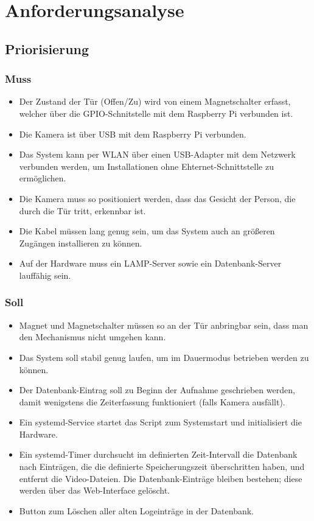 \chapter{Anforderungsanalyse}

\section{Priorisierung}

\subsection{Muss}
\begin{itemize}
    \item Der Zustand der T\"ur (Offen/Zu) wird von einem Magnetschalter erfasst, welcher \"uber die GPIO-Schnitstelle mit dem Raspberry Pi verbunden ist.
    \item Die Kamera ist \"uber USB mit dem Raspberry Pi verbunden.
    \item Das System kann per WLAN \"uber einen USB-Adapter mit dem Netzwerk verbunden werden, um Installationen ohne Ehternet-Schnittstelle zu erm\"oglichen.
    \item Die Kamera muss so positioniert werden, dass das Gesicht der Person, die durch die T\"ur tritt, erkennbar ist.
    \item Die Kabel m\"ussen lang genug sein, um das System auch an gr\"o{\ss}eren Zug\"angen installieren zu k\"onnen.
    \item Auf der Hardware muss ein LAMP-Server sowie ein Datenbank-Server lauff\"ahig sein.
\end{itemize}

\subsection{Soll}
\begin{itemize}
    \item Magnet und Magnetschalter m\"ussen so an der T\"ur anbringbar sein, dass man den Mechanismus nicht umgehen kann.
    \item Das System soll stabil genug laufen, um im Dauermodus betrieben werden zu k\"onnen.
    \item Der Datenbank-Eintrag soll zu Beginn der Aufnahme geschrieben werden, damit wenigstens die Zeiterfassung funktioniert (falls Kamera ausf\"allt).
    \item Ein systemd-Service startet das Script zum Systemstart und initialisiert die Hardware.
    \item Ein systemd-Timer durchsucht im definierten Zeit-Intervall die Datenbank nach Eintr\"agen, die die definierte Speicherungszeit \"uberschritten haben, und entfernt die Video-Dateien. Die Datenbank-Eintr\"age bleiben bestehen; diese werden \"uber das Web-Interface gel\"oscht.
    \item Button zum L\"oschen aller alten Logeintr\"age in der Datenbank.
\end{itemize}

